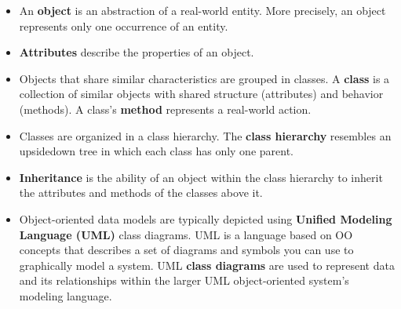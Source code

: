 \documentclass[a4paper, 12pt, titlepage]{report}
\begin{document}
\begin{itemize}
\item An \textbf{object} is an abstraction of a real-world entity. More precisely, an object represents only one occurrence of an entity.
\item \textbf{Attributes} describe the properties of an object.
\item Objects that share similar characteristics are grouped in classes. A \textbf{class} is a collection of similar objects with shared structure (attributes) and behavior (methods). A class’s \textbf{method} represents a real-world action.
\item Classes are organized in a class hierarchy. The \textbf{class hierarchy} resembles an upsidedown tree in which each class has only one parent.
\item \textbf{Inheritance} is the ability of an object within the class hierarchy to inherit the attributes and methods of the classes above it.
\item Object-oriented data models are typically depicted using \textbf{Unified Modeling Language (UML)} class diagrams. UML is a language based on OO concepts that describes a set of diagrams and symbols you can use to graphically model a system. UML \textbf{class diagrams} are used to represent data and its relationships within the larger UML object-oriented system’s modeling language.
\end{itemize}
\end{document}
